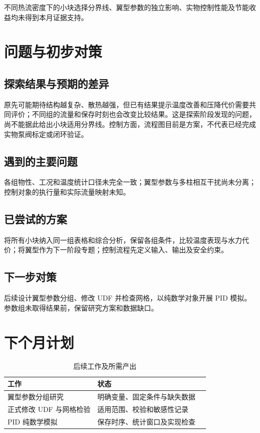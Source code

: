 \documentclass[stage2,fontset=fandol]{ydzjreport}
\begin{document}
不同热流密度下的小块选择分界线、翼型参数的独立影响、实物控制性能及节能收益均未得到本月证据支持。

\section{问题与初步对策}

\subsection{探索结果与预期的差异}

原先可能期待结构越复杂、散热越强，但已有结果提示温度改善和压降代价需要共同评价；不同组的流量和保存时刻也会改变比较结果。这是探索阶段发现的问题，尚不能据此给出小块适用分界线。控制方面，流程图目前是方案，不代表已经完成实物泵阀标定或闭环验证。



\subsection{遇到的主要问题}

各组物性、工况和温度统计口径未完全一致；翼型参数与多柱相互干扰尚未分离；控制对象的执行量和实际流量映射未知。

\subsection{已尝试的方案}

将所有小块纳入同一组表格和综合分析，保留各组条件，比较温度表现与水力代价；将翼型作为下一阶段专题；控制流程先定义输入、输出及安全约束。

\subsection{下一步对策}

后续设计翼型参数分组、修改 UDF 并检查网格，以纯数学对象开展 PID 模拟。参数组未取得结果前，保留研究方案和数据缺口。

\section{下个月计划}

\begin{table}[H]\centering
\caption{后续工作及所需产出}\label{tab:plan}
\begin{tabularx}{\textwidth}{@{}Y Y Y@{}}
\toprule
{} 工作 & 状态 \\
\midrule
翼型参数分组研究 & 明确变量、固定条件与缺失数据 \\
正式修改 UDF 与网格检验 & 适用范围、校验和敏感性记录  \\
PID 纯数学模拟 & 保存时序、统计窗口及实现检查  \\
\bottomrule\end{tabularx}\end{table}
\end{document}
